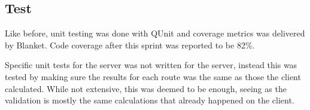 \subsection{Test}

Like before, unit testing was done with QUnit and coverage metrics was delivered by Blanket. Code coverage after this sprint was reported to be 82\%.

Specific unit tests for the server was not written for the server, instead this was tested by making sure the results for each route was the same as those the client calculated. While not extensive, this was deemed to be enough, seeing as the validation is mostly the same calculations that already happened on the client.
